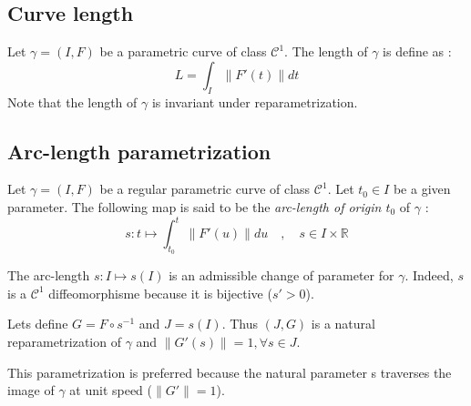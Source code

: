 \subsection{Curve length}
Let $\gamma=(I,F)$ be a parametric curve of class ${\mathcal{C}}^{1}$. The length of $\gamma$ is define as : 
\begin{equation}
L=\int_{I}\|F'(t)\|dt
\end{equation}
Note that the length of $\gamma$ is invariant under reparametrization.

\subsection{Arc-length parametrization}
Let $\gamma=(I,F)$ be a regular parametric curve of class ${\mathcal{C}}^{1}$. Let $t_0 \in I$ be a given parameter. The following map is said to be the \emph{arc-length of origin $t_0$} of $\gamma$ :
\begin{equation}
s \colon t \mapsto \int_{t_{0}}^{t}\|F'(u)\|du
\quad,\quad
s \in I \times \mathbb{R}
\end{equation}

The arc-length $s \colon I\mapsto s(I)$ is an admissible change of parameter for $\gamma$. Indeed, $s$ is a ${\mathcal{C}}^{1}$ diffeomorphisme because it is bijective ($s'>0$).

Lets define $G=F\circ s^{-1}$ and $J=s(I)$. Thus $(J,G)$ is a natural reparametrization of $\gamma$ and  $\|G'(s)\| = 1, \forall s \in J$.

This parametrization is preferred because the natural parameter s traverses the image of $\gamma$ at unit speed ($\|G'\| = 1$).




